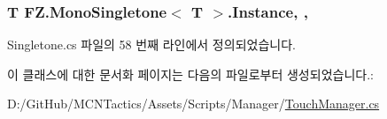 \subsubsection[{\texorpdfstring{Instance}{Instance}}]{\setlength{\rightskip}{0pt plus 5cm}T {\bf F\+Z.\+Mono\+Singletone}$<$ T $>$.Instance\hspace{0.3cm}{\ttfamily [static]}, {\ttfamily [get]}, {\ttfamily [inherited]}}\hypertarget{class_f_z_1_1_mono_singletone_a39e34129d25a9664576949259e7dfd5f}{}\label{class_f_z_1_1_mono_singletone_a39e34129d25a9664576949259e7dfd5f}


Singletone.\+cs 파일의 58 번째 라인에서 정의되었습니다.



이 클래스에 대한 문서화 페이지는 다음의 파일로부터 생성되었습니다.\+:\begin{DoxyCompactItemize}
\item 
D\+:/\+Git\+Hub/\+M\+C\+N\+Tactics/\+Assets/\+Scripts/\+Manager/\hyperlink{_touch_manager_8cs}{Touch\+Manager.\+cs}\end{DoxyCompactItemize}
